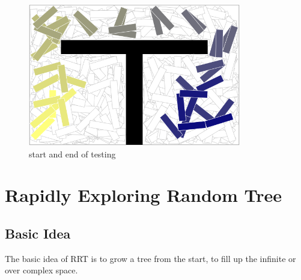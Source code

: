 \documentclass{article}
\begin{document}
\begin{figure}[!h]
\centering
\includegraphics[width=0.827\textwidth]{1-2.png}
\caption{start and end of testing}
\label{1-2}
\end{figure}






\clearpage
\section{Rapidly Exploring Random Tree}
\subsection{Basic Idea}
The basic idea of RRT is to grow a tree from the start, to fill up the infinite or over complex space. 
\end{document}
